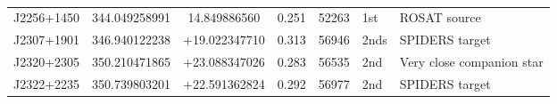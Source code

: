 \begin{table*}
\begin{tabular} {l  cc  cc l l}
J2256+1450   &   344.049258991   & 14.849886560        &0.251  & 52263      &   1st      & ROSAT source          \\
J2307+1901    &   346.940122238  &  +19.022347710     &0.313  & 56946     &   2nds   & SPIDERS target \\
J2320+2305    &  350.210471865  & +23.088347026       &  0.283 & 56535    &  2nd     & Very close companion star  \\
J2322+2235   &   350.739803201   &   +22.591362824    &0.292   & 56977   & 2nd       & SPIDERS target \\
\hline 
\hline
\end{tabular}
\caption{}
      \label{tab:list_of_targets}
\end{table*}